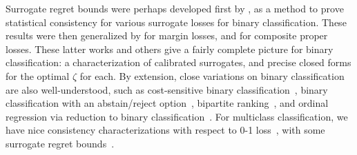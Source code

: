 \documentclass{article}
\theoremstyle{definition}\newtheorem{definition}{Definition}
\theoremstyle{definition}\newtheorem{assumption}{Assumption}
\begin{document}










Surrogate regret bounds were perhaps developed first by \citet{zhang2004statistical}, as a method to prove statistical consistency for various surrogate losses for binary classification.
These results were then generalized by \citet{bartlett2006convexity} for margin losses, and \citet{reid2009surrogate} for composite proper losses.
These latter works and others give a fairly complete picture for binary classification: a characterization of calibrated surrogates, and precise closed forms for the optimal $\zeta$ for each.
By extension, close variations on binary classification are also well-understood, such as  cost-sensitive binary classification~\citep{scott2012calibrated}, binary classification with an abstain/reject option~\citep{bartlett2008classification,yuan2010classification,cortes2016learning}, bipartite ranking~\citep{agarwal2014surrogate,gao2015consistency,menon2016bipartite}, and ordinal regression via reduction to binary classification~\citep{pedregosa2017consistency}.
For multiclass classification, we have nice consistency characterizations with respect to 0-1 loss~\citep{tewari2007consistency}, with some surrogate regret bounds~\citep{pires2013cost,duchi2018multiclass}.
\end{document}
